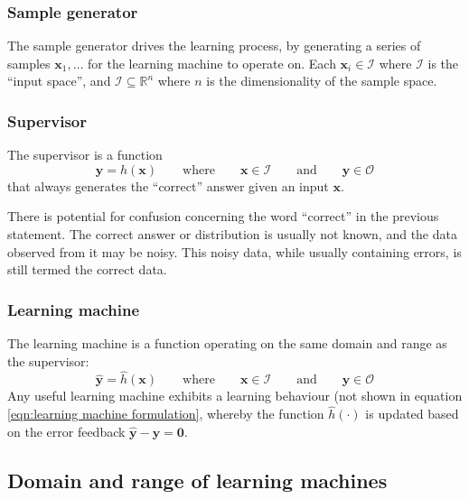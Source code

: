 \subsubsection{Sample generator}
\label{sec:sample generator}

The sample generator drives the learning process, by generating a
series of samples $\mathbf{x}_1, \ldots$ for the learning machine to
operate on.  Each $\mathbf{x}_i \in \mathcal{I}$ where $\mathcal{I}$
is the ``input space'', and $\mathcal{I} \subseteq \mathbb{R}^n$ where
$n$ is the dimensionality of the sample space.


\subsubsection{Supervisor}
\label{sec:supervisor}

The supervisor is a function
%
\begin{equation}
\mathbf{y} = h(\mathbf{x}) \qquad \mbox{where} \qquad \mathbf{x} \in
\mathcal{I} \qquad \mbox{and} \qquad \mathbf{y} \in \mathcal{O}
\label{eqn:supervisor}
\end{equation}
%
that always generates the ``correct'' answer given an input $\mathbf{x}$.

There is potential for confusion concerning the word ``correct'' in
the previous statement.  The correct answer or distribution is
usually not known, and the data observed from it may be noisy.  This
noisy data, while usually containing errors, is still termed the
correct data.


\subsubsection{Learning machine}
\label{sec:learning machine}

The learning machine is a function operating on the same domain and
range as the supervisor:
%
\begin{equation}
\mathbf{\hat{y}} = \hat{h}(\mathbf{x}) \qquad \mbox{where} \qquad
\mathbf{x} \in \mathcal{I} \qquad \mbox{and} \qquad \mathbf{y} \in
\mathcal{O}
\label{eqn:learning machine formulation}
\end{equation}
%
Any useful learning machine exhibits a learning behaviour (not shown in
equation \ref{eqn:learning machine formulation}, whereby the function
$\hat{h}(\cdot)$ is updated based on the error feedback
$\mathbf{\hat{y} - y = 0}$.


\subsection{Domain and range of learning machines}

